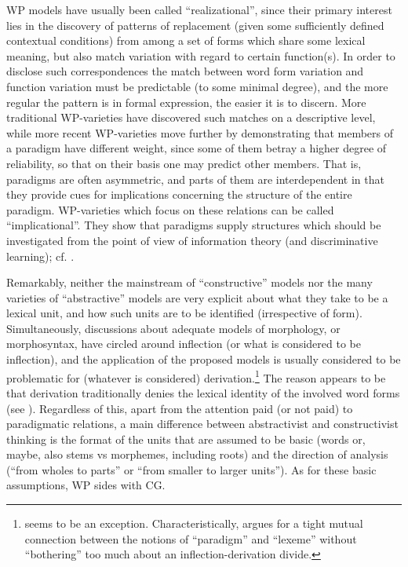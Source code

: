 \documentclass[output=paper]{langscibook}
\begin{document}
WP models have usually been called ``realizational'', since their primary interest lies in the discovery of patterns of replacement (given some sufficiently defined contextual conditions) from among a set of forms which share some lexical meaning, but also match variation with regard to certain function(s). In order to disclose such correspondences the match between word form variation and function variation must be predictable (to some minimal degree), and the more regular the pattern is in formal expression, the easier it is to discern. More traditional WP-varieties have discovered such matches on a descriptive level, while more recent WP-varieties move further by demonstrating that members of a paradigm have different weight, since some of them betray a higher degree of reliability, so that on their basis one may predict other members. That is, paradigms are often asymmetric, and parts of them are interdependent in that they provide cues for implications concerning the structure of the entire paradigm. WP-varieties which focus on these relations can be called ``implicational''. They show that paradigms supply structures which should be investigated from the point of view of information theory (and discriminative learning); cf. \citet{Blevins2016}.

Remarkably, neither the mainstream of ``constructive'' models nor the many varieties of ``abstractive'' models are very explicit about what they take to be a lexical unit, and how such units are to be identified (irrespective of form). Simultaneously, discussions about adequate models of morphology, or morphosyntax, have circled around inflection (or what is considered to be inflection), and the application of the proposed models is usually considered to be problematic for (whatever is considered) derivation.\footnote{\citet{Spencer2013} seems to be an exception. Characteristically, \citet{Spencer2020, SpencerForthc} argues for a tight mutual connection between the notions of ``paradigm'' and ``lexeme'' without “bothering” too much about an inflection-derivation divide.} The reason appears to be that derivation traditionally denies the lexical identity of the involved word forms (see ). Regardless of this, apart from the attention paid (or not paid) to paradigmatic relations, a main difference between abstractivist and constructivist thinking is the format of the units that are assumed to be basic (words or, maybe, also stems vs morphemes, including roots) and the direction of analysis (``from wholes to parts'' or ``from smaller to larger units''). As for these basic assumptions, WP sides with CG.
\end{document}
